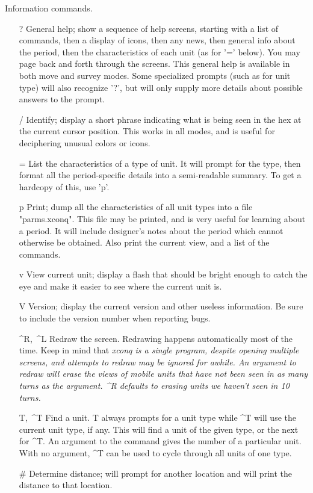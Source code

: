 Information commands.
\begin{itemize}
\item[{?}]
General help; show a sequence of help screens, starting with a list
of commands, then a display of icons, then any news, then general
info about the period, then the characteristics
of each unit (as for '=' below).  You may page back and forth through the
screens.
This general help is available in both move and survey modes.
Some specialized prompts (such as for unit type) will
also recognize '?', but will only supply more details about possible answers
to the prompt.
\item[{/}]
Identify; display a short phrase indicating what is being seen
in the hex at the current cursor position.  This works in all modes,
and is useful for deciphering unusual colors or icons.
\item[{=}]
List the characteristics of a type of unit.  It will prompt for the type,
then format all the period-specific details into a semi-readable summary.
To get a hardcopy of this, use 'p'.
\item[{p}]
Print; dump all the characteristics of all unit types into a file
"parms.xconq".
This file may be printed, and is very useful for learning about a period.
It will include designer's notes about the period which cannot otherwise
be obtained.
Also print the current view, and a list of the commands.
\item[{v}]
View current unit; display a flash that should be bright enough to
catch the eye and make it easier to see where the current unit is.
\item[{V}]
Version; display the current version and other useless information.
Be sure to include the version number when reporting bugs.
\item[{\^{}R,\ \^{}L}]
Redraw the screen.  Redrawing happens automatically most of the time.
Keep in mind that %
\it xconq \rm%
is a single program, despite opening multiple
screens, and attempts to redraw may be ignored for awhile.  An
argument to redraw will erase the views of mobile units that have not
been seen in as many turns as the argument.  \^{}R defaults to erasing
units we haven't seen in 10 turns.
\item[{T,\ \^{}T}]
Find a unit.  T always prompts for a unit type while \^{}T will use the
current unit type, if any.  This will find a unit of the given type,
or the next for \^{}T.  An argument to the command gives the number of
a particular unit.  With no argument, \^{}T can be used to cycle through
all units of one type.
\item[{\#}]
Determine distance; will prompt for another location and will print
the distance to that location.
\end{itemize}\par\noindent
